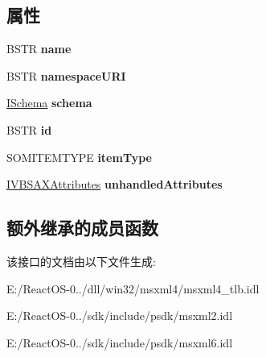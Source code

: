 \subsection*{属性}
\begin{DoxyCompactItemize}
\item 
\mbox{\label{interface_m_s_x_m_l2_1_1_i_schema_item_acb8e31e23f0605a4881a0e651c99ad4f}} 
B\+S\+TR {\bfseries name}
\item 
\mbox{\label{interface_m_s_x_m_l2_1_1_i_schema_item_a6b53b43c73bcda98eff17423a90d0f96}} 
B\+S\+TR {\bfseries namespace\+U\+RI}
\item 
\mbox{\label{interface_m_s_x_m_l2_1_1_i_schema_item_abcb242f3f914b143d965f61686f7379a}} 
\hyperlink{interface_m_s_x_m_l2_1_1_i_schema}{I\+Schema} {\bfseries schema}
\item 
\mbox{\label{interface_m_s_x_m_l2_1_1_i_schema_item_a7c2a70e67e00bc3fa4b0619dd463ef74}} 
B\+S\+TR {\bfseries id}
\item 
\mbox{\label{interface_m_s_x_m_l2_1_1_i_schema_item_a64d533195efa66ec88a4a7afdbfb4d05}} 
S\+O\+M\+I\+T\+E\+M\+T\+Y\+PE {\bfseries item\+Type}
\item 
\mbox{\label{interface_m_s_x_m_l2_1_1_i_schema_item_a2d311360d3e72c2a6956cb2169e56a3d}} 
\hyperlink{interface_m_s_x_m_l2_1_1_i_v_b_s_a_x_attributes}{I\+V\+B\+S\+A\+X\+Attributes} {\bfseries unhandled\+Attributes}
\end{DoxyCompactItemize}
\subsection*{额外继承的成员函数}


该接口的文档由以下文件生成\+:\begin{DoxyCompactItemize}
\item 
E\+:/\+React\+O\+S-\/0../dll/win32/msxml4/msxml4\+\_\+tlb.\+idl\item 
E\+:/\+React\+O\+S-\/0../sdk/include/psdk/msxml2.\+idl\item 
E\+:/\+React\+O\+S-\/0../sdk/include/psdk/msxml6.\+idl\end{DoxyCompactItemize}
